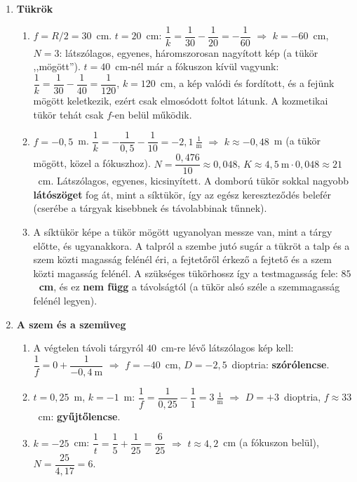\documentclass[11pt,a4paper]{article}
\begin{document}
\begin{enumerate}
\item \textbf{Tükrök}
  \begin{enumerate}
    \item $f = R/2 = 30$~cm. $t = 20$~cm: $\dfrac1k = \dfrac1{30} - \dfrac1{20} = -\dfrac1{60}$
      $\Rightarrow$ $k = -60$~cm, $N = 3$: látszólagos, egyenes, háromszorosan nagyított kép
      (a tükör ,,mögött''). $t = 40$~cm-nél már a fókuszon kívül vagyunk:
      $\dfrac1k = \dfrac1{30} - \dfrac1{40} = \dfrac1{120}$, $k = 120$~cm, a kép valódi és
      fordított, és a fejünk mögött keletkezik, ezért csak elmosódott foltot látunk. A
      kozmetikai tükör tehát csak $f$-en belül működik.
    \item $f = -0{,}5$~m. $\dfrac1k = -\dfrac1{0{,}5} - \dfrac1{10} = -2{,}1~\tfrac1{\text{m}}$
      $\Rightarrow$ $k \approx -0{,}48$~m (a tükör mögött, közel a fókuszhoz).
      $N = \dfrac{0{,}476}{10} \approx 0{,}048$, $K \approx 4{,}5~\text{m}\cdot 0{,}048
      \approx 21$~cm. Látszólagos, egyenes, kicsinyített. A domború tükör sokkal nagyobb
      \textbf{látószöget} fog át, mint a síktükör, így az egész kereszteződés belefér (cserébe
      a tárgyak kisebbnek és távolabbinak tűnnek).
    \item A síktükör képe a tükör mögött ugyanolyan messze van, mint a tárgy előtte, és
      ugyanakkora. A talpról a szembe jutó sugár a tükröt a talp és a szem közti magasság
      felénél éri, a fejtetőről érkező a fejtető és a szem közti magasság felénél. A
      szükséges tükörhossz így a testmagasság fele: \textbf{$85$~cm}, és ez \textbf{nem
      függ} a távolságtól (a tükör alsó széle a szemmagasság felénél legyen).
  \end{enumerate}

\item \textbf{A szem és a szemüveg}
  \begin{enumerate}
    \item A végtelen távoli tárgyról $40$~cm-re lévő látszólagos kép kell:
      $\dfrac1f = 0 + \dfrac1{-0{,}4~\text{m}}$ $\Rightarrow$ $f = -40$~cm,
      $D = -2{,}5$~dioptria: \textbf{szórólencse}.
    \item $t = 0{,}25$~m, $k = -1$~m: $\dfrac1f = \dfrac1{0{,}25} - \dfrac11 = 3~\tfrac1{\text{m}}$
      $\Rightarrow$ $D = +3$~dioptria, $f \approx 33$~cm: \textbf{gyűjtőlencse}.
    \item $k = -25$~cm: $\dfrac1t = \dfrac15 + \dfrac1{25} = \dfrac6{25}$ $\Rightarrow$
      $t \approx 4{,}2$~cm (a fókuszon belül), $N = \dfrac{25}{4{,}17} = 6$.
  \end{enumerate}


\end{enumerate}
\end{document}
